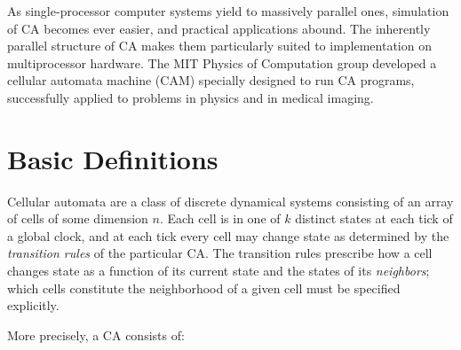 As single-processor computer systems yield to massively parallel ones,
simulation of CA becomes ever easier, and practical applications
abound.  The inherently parallel structure of CA makes them
particularly suited to implementation on multiprocessor hardware.  The
MIT Physics of Computation group developed a cellular automata machine
(CAM) specially designed to run CA programs, successfully applied to
problems in physics and in medical imaging.


\section{Basic Definitions}

Cellular automata are a class of discrete dynamical systems consisting
of an array of cells of some dimension $n$.  Each cell is in one of $k$
distinct states at each tick of a global clock, and at each tick every
cell may change state as determined by the \emph{transition rules} of
the particular CA.  The transition rules prescribe how a cell changes
state as a function of its current state and the states of its
\emph{neighbors}; which cells constitute the neighborhood of a given
cell must be specified explicitly.

More precisely, a CA consists of:

